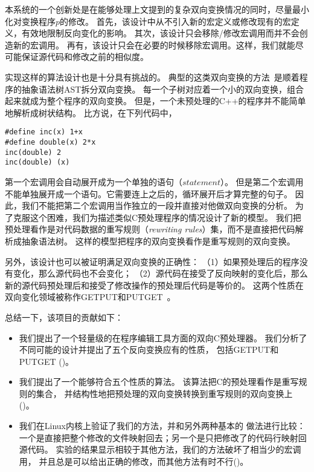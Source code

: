 
本系统的一个创新处是在能够处理上文提到的复杂双向变换情况的同时，尽量最小化对变换程序$p$的修改。
首先，该设计中从不引入新的宏定义或修改现有的宏定义，有效地限制反向变化的影响。
其次，该设计只会移除/修改宏调用而并不会创造新的宏调用。
再有，该设计只会在必要的时候移除宏调用。这样，我们就能尽可能保证源代码和修改之前的相似度。


实现这样的算法设计也是十分具有挑战的。
典型的这类双向变换的方法~\parencite{MaHNHT07,Voigtlander09bff,MMHT10}是顺着程序的抽象语法树AST拆分双向变换。
每一个子树对应着一个小的双向变换，组合起来就成为整个程序的双向变换。
但是，一个未预处理的C++的程序并不能简单地解析成树状结构。
比方说，在下列代码中，
\begin{lstlisting}
#define inc(x) 1+x
#define double(x) 2*x
inc(double) 2
inc(double) (x)
\end{lstlisting}
第一个宏调用会自动展开成为一个单独的语句（$statement$）。
但是第二个宏调用不能单独展开成一个语句。它需要连上之后的，循环展开后才算完整的句子。
因此，我们不能把第二个宏调用当作独立的一段并直接对他做双向变换的分析。
为了克服这个困难，我们为描述类似C预处理程序的情况设计了新的模型。
我们把预处理看作是对代码数据的重写规则（\emph{rewriting rules}）集，而不是直接把代码解析成抽象语法树。
这样的模型把程序的双向变换看作是重写规则的双向变换。


另外，该设计也可以被证明满足双向变换的正确性：
（1）如果预处理后的程序没有变化，那么源代码也不会变化；
（2）源代码在接受了反向映射的变化后，那么新的源代码预处理后和接受了修改操作的预处理后代码是等价的。
这两个性质在双向变化领域被称作GETPUT和PUTGET~\parencite{Foster:2007}。

总结一下，该项目的贡献如下：
\begin{itemize}
\item 我们提出了一个轻量级的在程序编辑工具方面的双向C预处理器。
	我们分析了不同可能的设计并提出了五个反向变换应有的性质，
	包括GETPUT和PUTGET
	()。
\item 我们提出了一个能够符合五个性质的算法。
	该算法把C的预处理看作是重写规则的集合，
	并结构性地把预处理的双向变换转换到重写规则的双向变换上
	()。
\item 我们在Linux内核上验证了我们的方法，并和另外两种基本的
	做法进行比较：一个是直接把整个修改的文件映射回去；另一个是只把修改了的代码行映射回源代码。
	实验的结果显示相较于其他方法，我们的方法破坏了相当少的宏调用，
	并且总是可以给出正确的修改，而其他方法有时不行()。
\end{itemize}

